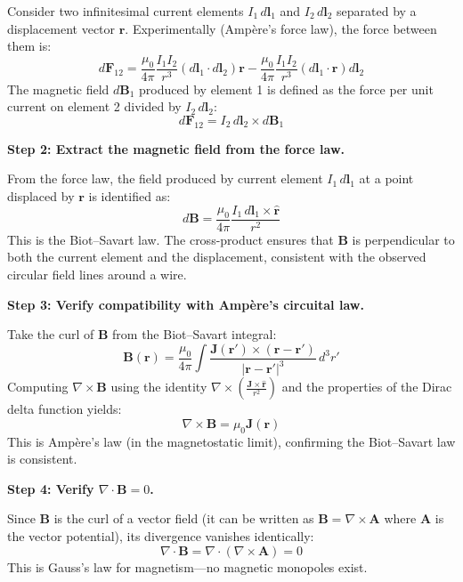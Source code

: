 \documentclass[11pt,openright]{book}
\begin{document}
Consider two infinitesimal current elements $I_1\,d\mathbf{l}_1$ and $I_2\,d\mathbf{l}_2$ separated by a displacement vector $\mathbf{r}$. Experimentally (Ampère's force law), the force between them is:
\begin{equation}
d\mathbf{F}_{12} = \frac{\mu_0}{4\pi}\frac{I_1 I_2}{r^3}\left(d\mathbf{l}_1\cdot d\mathbf{l}_2\right)\mathbf{r} - \frac{\mu_0}{4\pi}\frac{I_1 I_2}{r^3}\left(d\mathbf{l}_1\cdot\mathbf{r}\right)d\mathbf{l}_2
\end{equation}
The magnetic field $d\mathbf{B}_1$ produced by element 1 is defined as the force per unit current on element 2 divided by $I_2\,d\mathbf{l}_2$:
\begin{equation}
d\mathbf{F}_{12} = I_2\,d\mathbf{l}_2 \times d\mathbf{B}_1
\end{equation}

\textbf{Step 2: Extract the magnetic field from the force law.}

From the force law, the field produced by current element $I_1\,d\mathbf{l}_1$ at a point displaced by $\mathbf{r}$ is identified as:
\begin{equation}
d\mathbf{B} = \frac{\mu_0}{4\pi}\frac{I_1\,d\mathbf{l}_1 \times \hat{\mathbf{r}}}{r^2}
\end{equation}
This is the Biot--Savart law. The cross-product ensures that $\mathbf{B}$ is perpendicular to both the current element and the displacement, consistent with the observed circular field lines around a wire.

\textbf{Step 3: Verify compatibility with Ampère's circuital law.}

Take the curl of $\mathbf{B}$ from the Biot--Savart integral:
\begin{equation}
\mathbf{B}(\mathbf{r}) = \frac{\mu_0}{4\pi}\int\frac{\mathbf{J}(\mathbf{r}')\times(\mathbf{r}-\mathbf{r}')}{|\mathbf{r}-\mathbf{r}'|^3}\,d^3r'
\end{equation}
Computing $\nabla\times\mathbf{B}$ using the identity $\nabla\times\left(\frac{\mathbf{J}\times\hat{\mathbf{r}}}{r^2}\right)$ and the properties of the Dirac delta function yields:
\begin{equation}
\nabla\times\mathbf{B} = \mu_0\mathbf{J}(\mathbf{r})
\end{equation}
This is Ampère's law (in the magnetostatic limit), confirming the Biot--Savart law is consistent.

\textbf{Step 4: Verify $\nabla\cdot\mathbf{B} = 0$.}

Since $\mathbf{B}$ is the curl of a vector field (it can be written as $\mathbf{B} = \nabla\times\mathbf{A}$ where $\mathbf{A}$ is the vector potential), its divergence vanishes identically:
\begin{equation}
\nabla\cdot\mathbf{B} = \nabla\cdot(\nabla\times\mathbf{A}) = 0
\end{equation}
This is Gauss's law for magnetism---no magnetic monopoles exist.
\end{document}
